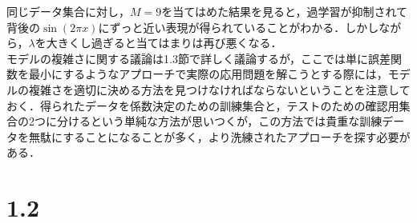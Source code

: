 \documentclass{jsarticle}
\theoremstyle{definition}
\begin{document}
同じデータ集合に対し，$M=9$を当てはめた結果を見ると，過学習が抑制されて背後の$\sin (2\pi x)$にずっと近い表現が得られていることがわかる．しかしながら，$\lambda$を大きくし過ぎると当てはまりは再び悪くなる．\\

モデルの複雑さに関する議論は1.3節で詳しく議論するが，ここでは単に誤差関数を最小にするようなアプローチで実際の応用問題を解こうとする際には，モデルの複雑さを適切に決める方法を見つけなければならないということを注意しておく．得られたデータを係数決定のための訓練集合と，テストのための確認用集合の2つに分けるという単純な方法が思いつくが，この方法では貴重な訓練データを無駄にすることになることが多く，より洗練されたアプローチを探す必要がある．\\

\section*{1.2}
\end{document}
